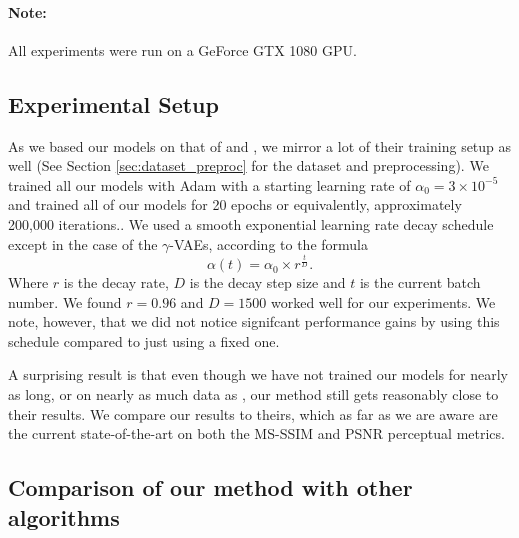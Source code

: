 \documentclass{article}
\begin{document}

\paragraph{Note:} All experiments were run on a GeForce GTX 1080 GPU.

\subsection{Experimental Setup}
\par
As we based our models on that of \cite{balle2016end} and
\cite{balle2018variational}, we mirror a lot of their training setup as well
(See Section \ref{sec:dataset_preproc} for the dataset and preprocessing). We
trained all our models with Adam with a starting learning rate of $\alpha_0 =
3 \times 10^{-5}$ and trained all of our models for 20 epochs or equivalently,
approximately 200,000 iterations.. We used a smooth
exponential learning rate decay schedule except in the case of the
$\gamma$-VAEs, according to the formula
\[
  \alpha(t) = \alpha_0 \times r^{\frac{t}{D}}.
\]
Where $r$ is the decay rate, $D$ is the decay step size and $t$ is the current
batch number. We found $r = 0.96$ and $D = 1500$ worked well for our
experiments. We note, however, that we did not notice signifcant performance
gains by using this schedule compared to just using a fixed one.
\par
A surprising result is that even though we have not trained our models for
nearly as long, or on nearly as much data as \cite{balle2018variational}, our
method still gets reasonably close to their results. We compare our results to
theirs, which as far as we are aware are the current state-of-the-art on both
the MS-SSIM and PSNR perceptual metrics.

\subsection{Comparison of our method with other algorithms}
\par
\end{document}
